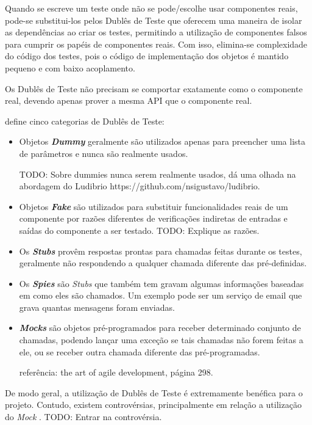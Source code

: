Quando se escreve um teste onde não se pode/escolhe usar componentes reais, pode-se substitui-los pelos Dublês de Teste que oferecem uma maneira de isolar as dependências ao criar os testes, permitindo a utilização de componentes falsos para cumprir os papéis de componentes reais. Com isso, elimina-se complexidade do código dos testes, pois o código de implementação dos objetos é mantido pequeno e com baixo acoplamento.

Os Dublês de Teste não precisam se comportar exatamente como o componente real, devendo apenas prover a mesma API que o componente real.

 define cinco categorias de Dublês de Teste:

\begin{itemize}
\item
Objetos \textbf{\textit{Dummy}} geralmente são utilizados apenas para preencher uma lista de parâmetros e nunca são realmente usados.

TODO: Sobre dummies nunca serem realmente usados, dá uma olhada na abordagem do Ludibrio https://github.com/nsigustavo/ludibrio.

\item
Objetos \textbf{\textit{Fake}} são utilizados para substituir funcionalidades reais de um componente por razões diferentes de verificações indiretas de entradas e saídas do componente a ser testado. TODO: Explique as razões.

\item
Os \textbf{\textit{Stubs}} provêm respostas prontas para chamadas feitas durante os testes, geralmente não respondendo a qualquer   chamada diferente
das pré-definidas.

\item
Os \textbf{\textit{Spies}} são \textit{Stubs} que também tem gravam algumas informações baseadas em como eles são chamados. Um exemplo   pode ser um serviço de email que grava quantas mensagens foram   enviadas.

\item
\textbf{\textit{Mocks}} são objetos pré-programados para receber determinado conjunto de chamadas, podendo lançar uma exceção se tais chamadas não forem feitas a ele, ou se receber outra chamada diferente das pré-programadas.

referência: the art of agile development, página 298.
\end{itemize}

De modo geral, a utilização de Dublês de Teste é extremamente benéfica para o projeto. Contudo, existem controvérsias, principalmente em relação a utilização do \textit{Mock} \cite{MocksArentStubs}. TODO: Entrar na controvérsia.


